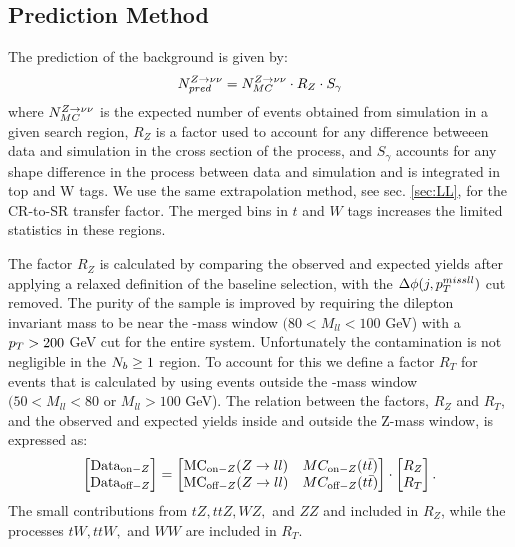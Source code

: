 \subsection{Prediction Method}\label{subsec:znunupred}

The prediction of the \Znunu{} background is given by:
\begin{equation}
N_{pred}^{Z\rightarrow\nu\nu}=N_{MC}^{Z\rightarrow\nu\nu} \cdot R_Z \cdot S_\gamma
\end{equation}
where $N_{MC}^{Z\rightarrow\nu\nu}$ is the expected number of \Znunu{} events obtained from simulation in a given search region, $R_Z$ is a factor used to account for any difference betweeen data and simulation in the cross section of the \Znunu{} process, and $S_\gamma$ accounts for any shape difference in the \Znunu{} process between data and simulation and is integrated in top and W tags. We use the same extrapolation method, see sec. \ref{sec:LL}, for the CR-to-SR transfer factor. The merged bins in $t$ and $W$ tags increases the limited statistics in these regions. 

The factor $R_Z$ is calculated by comparing the observed and expected \Zll{} yields after applying a relaxed definition of the baseline selection, with the $\Delta\phi(j,p_{T}^{miss ll})$ cut removed. The purity of the sample is improved by requiring the dilepton invariant mass to be near the \Z-mass window $(80<M_{ll}<100$ GeV) with a $p_{T}>200$ GeV cut for the entire system. Unfortunately the \ttbar{} contamination is not negligible in the $N_{b}\geq1$ region. To account for this we define a factor $R_T$ for \ttbar{} events that is calculated by using events outside the \Z-mass window $(50<M_{ll}<80$ or $M_{ll}>100$ GeV). The relation between the factors, $R_Z$ and $R_T$, and the observed and expected yields inside and outside the Z-mass window, is expressed as:
\begin{equation}
\begin{bmatrix}
\text{Data}_{\text{on}-Z} \\
\text{Data}_{\text{off}-Z}
\end{bmatrix}
=
\begin{bmatrix}
\text{MC}_{\text{on}-Z}(Z\rightarrow ll) & MC_{\text{on}-Z}(t\bar{t}) \\
\text{MC}_{\text{off}-Z}(Z\rightarrow ll) & MC_{\text{off}-Z}(t\bar{t})
\end{bmatrix}
\cdot
\begin{bmatrix}
R_Z \\
R_T
\end{bmatrix}.
\end{equation}
The small contributions from $tZ, ttZ, WZ,$ and $ZZ$ and included in $R_Z$, while the processes $tW, ttW,$ and $WW$ are included in $R_T$. 

